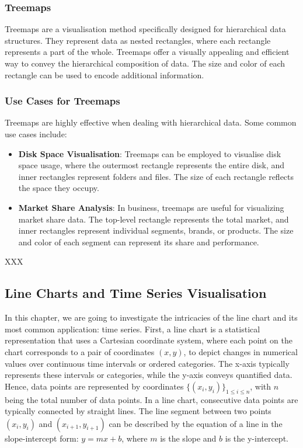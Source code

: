 \documentclass{article}\usepackage[]{graphicx}\usepackage[]{xcolor}
\begin{document}
\subsubsection{Treemaps}
Treemaps are a visualisation method specifically designed for hierarchical data structures. They represent data as nested rectangles, where each rectangle represents a part of the whole. Treemaps offer a visually appealing and efficient way to convey the hierarchical composition of data. The size and color of each rectangle can be used to encode additional information.

\subsubsection{Use Cases for Treemaps}
Treemaps are highly effective when dealing with hierarchical data. Some common use cases include:
\begin{itemize}
\item \textbf{Disk Space Visualisation}: Treemaps can be employed to visualise disk space usage, where the outermost rectangle represents the entire disk, and inner rectangles represent folders and files. The size of each rectangle reflects the space they occupy.
\item \textbf{Market Share Analysis}: In business, treemaps are useful for visualizing market share data. The top-level rectangle represents the total market, and inner rectangles represent individual segments, brands, or products. The size and color of each segment can represent its share and performance.
\end{itemize}

XXX %


\subsection{Line Charts and Time Series Visualisation}

In this chapter, we are going to investigate the intricacies of the line chart and its most common application: time series.
First, a line chart is a statistical representation that uses a Cartesian coordinate system, where each point on the chart corresponds to a pair of coordinates \((x,y)\), to depict changes in numerical values over continuous time intervals or ordered categories. The x-axis typically represents these intervals or categories, while the y-axis conveys quantified data. Hence, data points are represented by coordinates \(\{(x_i,y_i)\}_{1 \leq i \leq n}\), with \(n\) being the total number of data points. In a line chart, consecutive data points are typically connected by straight lines. The line segment between two points \((x_i,y_i)\) and \((x_{i+1},y_{i+1})\) can be described by the equation of a line in the slope-intercept form: \(y=mx+b\), where \(m\) is the slope and \(b\) is the y-intercept.
\end{document}
